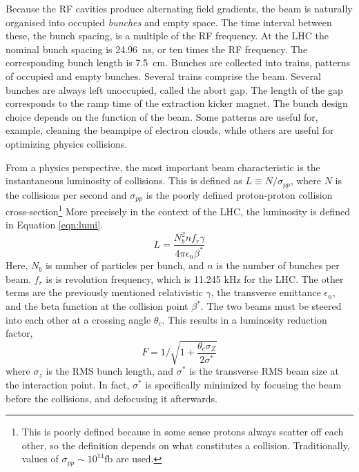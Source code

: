 Because the RF cavities produce alternating field gradients, the beam is naturally organised into occupied \emph{bunches} and empty space.
The time interval between these, the bunch spacing, is a multiple of the RF frequency.
At the LHC the nominal bunch spacing is 24.96~ns, or ten times the RF frequency. The corresponding bunch length is 7.5~cm. \cite{boussard}
Bunches are collected into trains, patterns of occupied and empty bunches.
Several trains comprise the beam.
Several bunches are always left unoccupied, called the abort gap. The length of the gap corresponds to the ramp time of the extraction kicker magnet.
The bunch design choice depends on the function of the beam. Some patterns are useful for, example, cleaning the beampipe of electron clouds, while others are useful for optimizing physics collisions.

From a physics perspective, the most important beam characteristic is the instantaneous luminosity of collisions.
This is defined as $L\equiv N/\sigma_{pp}$, where $N$ is the collisions per second and $\sigma_{pp}$ is the poorly defined proton-proton collision cross-section\footnote{This is poorly defined because in some sense protons always scatter off each other, so the definition depends on what constitutes a collision. Traditionally, values of $\sigma_{pp}\sim10^{14}\text{fb}$ are used.} \cite{lyndon}
More precisely in the context of the LHC, the luminosity is defined in Equation \ref{eqn:lumi}.\cite{lyndon}
\begin{equation}\label{eqn:lumi}
    L=\frac{N_b^2nf_r\gamma}{4\pi\epsilon_n\beta^*}
\end{equation}
Here, $N_b$ is number of particles per bunch, and $n$ is the number of bunches per beam.
$f_r$ is is revolution frequency, which is 11.245 kHz for the LHC.
The other terms are the previously mentioned relativistic $\gamma$, the transverse emittance $\epsilon_n$, and the beta function at the collision point $\beta^*$.
The two beams must be steered into each other at a crossing angle $\theta_c$.
This results in a luminosity reduction factor,
\begin{equation}\label{eqn:lumiReduce}
    F=1/\sqrt{1+\frac{\theta_c\sigma_Z}{2\sigma^*}}
\end{equation}
where $\sigma_z$ is the RMS bunch length, and $\sigma^*$ is the transverse RMS beam size at the interaction point.
In fact, $\sigma^*$ is specifically minimized by focusing the beam before the collisions, and defocusing it afterwards.


